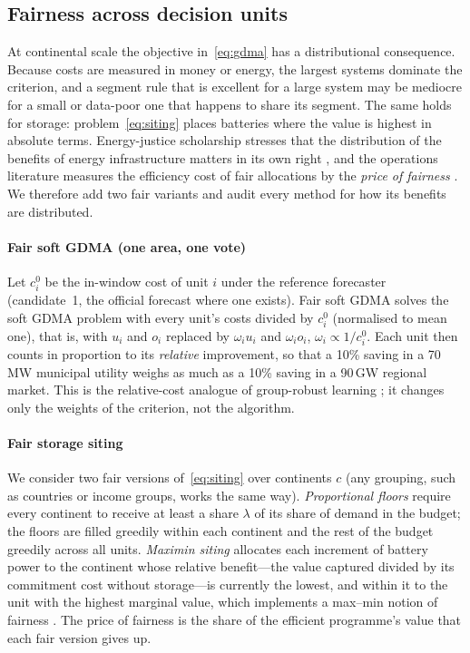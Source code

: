 \subsection{Fairness across decision units}\label{sec:fair}

At continental scale the objective in~\eqref{eq:gdma} has a distributional consequence.
Because costs are measured in money or energy, the largest systems dominate the criterion, and a segment rule that is excellent for a large system may be mediocre for a small or data-poor one that happens to share its segment.
The same holds for storage: problem~\eqref{eq:siting} places batteries where the value is highest in absolute terms.
Energy-justice scholarship stresses that the distribution of the benefits of energy infrastructure matters in its own right \citep{SovacoolDworkin2015}, and the operations literature measures the efficiency cost of fair allocations by the \emph{price of fairness} \citep{Bertsimas2011pof}.
We therefore add two fair variants and audit every method for how its benefits are distributed.

\paragraph{Fair soft GDMA (one area, one vote)}
Let $c^0_i$ be the in-window cost of unit $i$ under the reference forecaster (candidate~1, the official forecast where one exists).
Fair soft GDMA solves the soft GDMA problem with every unit's costs divided by $c^0_i$ (normalised to mean one), that is, with $u_i$ and $o_i$ replaced by $\omega_iu_i$ and $\omega_io_i$, $\omega_i\propto1/c^0_i$.
Each unit then counts in proportion to its \emph{relative} improvement, so that a 10\% saving in a 70\,MW municipal utility weighs as much as a 10\% saving in a 90\,GW regional market.
This is the relative-cost analogue of group-robust learning \citep{Sagawa2020gdro}; it changes only the weights of the criterion, not the algorithm.

\paragraph{Fair storage siting}
We consider two fair versions of~\eqref{eq:siting} over continents $c$ (any grouping, such as countries or income groups, works the same way).
\emph{Proportional floors} require every continent to receive at least a share $\lambda$ of its share of demand in the budget; the floors are filled greedily within each continent and the rest of the budget greedily across all units.
\emph{Maximin siting} allocates each increment of battery power to the continent whose relative benefit---the value captured divided by its commitment cost without storage---is currently the lowest, and within it to the unit with the highest marginal value, which implements a max--min notion of fairness \citep{Bertsimas2011pof}.
The price of fairness is the share of the efficient programme's value that each fair version gives up.

